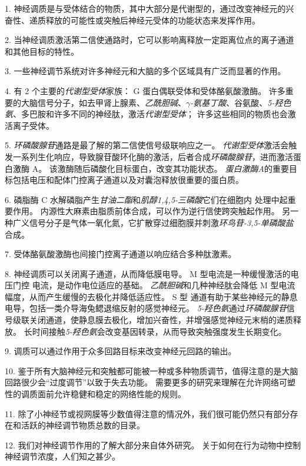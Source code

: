 1. 神经调质是与受体结合的物质，其中大部分是代谢型的，通过改变神经元的兴奋性、递质释放的可能性或突触后神经元受体的功能状态来发挥作用。


2. 当神经调质激活第二信使通路时，它可以影响离释放一定距离位点的离子通道和其他目标的特性。


3. 一些神经调节系统对许多神经元和大脑的多个区域具有广泛而显著的作用。


4. 有 2 个主要的\textit{代谢型受体}家族：
G 蛋白偶联受体和受体酪氨酸激酶。 
许多重要的大脑信号分子，如去甲肾上腺素、\textit{乙酰胆碱}、\textit{$\gamma$-氨基丁酸}、谷氨酸、\textit{5-羟色氨}、多巴胺和许多不同的神经肽，激活\textit{代谢型受体}；
许多这些相同的物质也会激活离子受体。 


5. \textit{环磷酸腺苷}通路是最了解的第二信使信号级联响应之一。
\textit{代谢型受体}激活会触发一系列生化响应，导致腺苷酸环化酶的激活，后者合成\textit{环磷酸腺苷}，进而激活蛋白激酶 A。
该激酶随后磷酸化目标蛋白，改变其功能状态。
\textit{蛋白激酶A}的重要目标包括电压和配体门控离子通道以及对囊泡释放很重要的蛋白质。 


6. 磷脂酶 C 水解磷脂产生\textit{甘油二酯}和\textit{肌醇1,4,5-三磷酸}它们在细胞内  处理中起重要作用。
内源性大麻素由脂质前体合成，可以作为逆行信使跨突触起作用。
另一种广义信号分子是气体一氧化氮，它扩散穿过细胞膜并刺激\textit{环鸟苷-3,5-单磷酸盐}合成。


7. 受体酪氨酸激酶也间接门控离子通道以响应结合多种肽激素。 


8. 神经调质可以关闭离子通道，从而降低膜电导。
M 型电流是一种缓慢激活的电压门控  电流，是动作电位适应的基础。
\textit{乙酰胆碱}和几种神经肽会降低 M 型电流幅度，从而产生缓慢的去极化并降低适应性。
S 型  通道有助于某些神经元的静息  电导，包括一类介导海兔鳃退缩反射的感觉神经元。
\textit{5-羟色氨}通过\textit{环磷酸腺苷}信号级联关闭通道，使静息膜去极化，增加兴奋性，并增强感觉神经元末梢的递质释放。
长时间接触\textit{5-羟色氨}会改变基因转录，从而导致突触强度发生长期变化。 


9. 调质可以通过作用于众多回路目标来改变神经元回路的输出。 


10. 鉴于所有大脑神经元和突触都可能被一种或多种物质调节，值得注意的是大脑回路很少会“过度调节”以致于失去功能。
需要更多的研究来理解在允许网络可塑性的调质面前允许稳健和稳定的网络性能的规则。


11. 除了小神经节或视网膜等少数值得注意的情况外，我们很可能仍然只有部分存在和活跃的神经调节物质总数的目录。


12. 我们对神经调节作用的了解大部分来自体外研究。
关于如何在行为动物中控制神经调节浓度，人们知之甚少。






